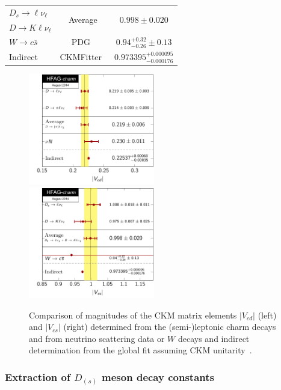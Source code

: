 \begin{table}[htb]
\begin{center}
\begin{tabular}{lcc}
\midrule
\rowcolor{Gray} $D_s\to\ell\nu_{\ell}$ 	& \multirow{2}{*}{Average}	& \multirow{2}{*}{$0.998\pm0.020$}\\
\rowcolor{Gray} $D\to K\ell\nu_{\ell}$ & \multirow{-2}{*}{Average}	& \multirow{-2}{*}{$0.998\pm0.020$}\\
\midrule
$W\to c\overline{s}$	& PDG~\cite{PDG_2012}	& $0.94^{+0.32}_{-0.26}\pm0.13$\\
Indirect		& CKMFitter~\cite{Charles:2004jd}		& $0.973395^{+0.000095}_{-0.000176}$\\
\bottomrule
\end{tabular}
\end{center}
\end{table}

\begin{figure}[hbt!]
\centering
\includegraphics[width=0.49\textwidth]{figures/charm/Vcd.pdf}~
\includegraphics[width=0.49\textwidth]{figures/charm/Vcs.pdf}
\caption{
Comparison of magnitudes of the CKM matrix elements $|V_{cd}|$ (left) and $|V_{cs}|$ (right) determined from the (semi-)leptonic charm decays and from neutrino scattering data
or $W$ decays and indirect determination from the global fit assuming CKM unitarity~\cite{Charles:2004jd}.
\label{fig:VcdVcsComparions}
}
\end{figure}

\subsubsection{Extraction of $D_{(s)}$ meson decay constants}

